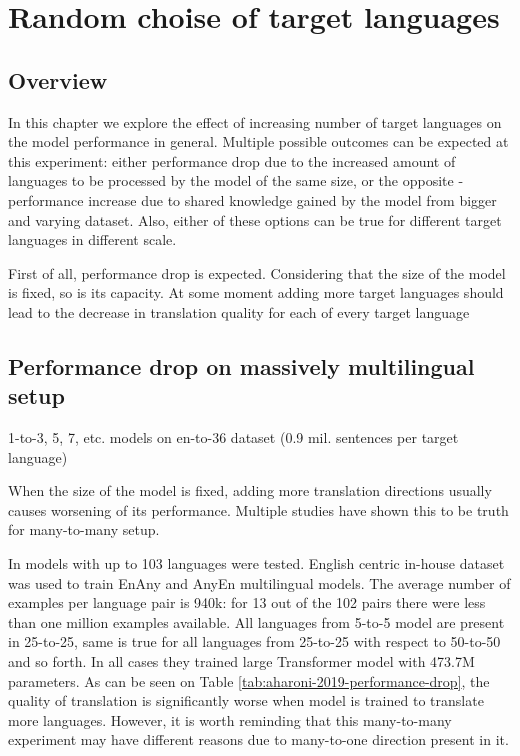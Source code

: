 \chapter{Random choise of target languages}


\section{Overview}

In this chapter we explore the effect of increasing number of target languages on the model performance in general.
Multiple possible outcomes can be expected at this experiment:
either performance drop due to the increased amount of languages to be processed by the model of the same size,
or the opposite - performance increase due to shared knowledge gained by the model from bigger and varying dataset. 
Also, either of these options can be true for different target languages in different scale.

First of all, performance drop is expected. Considering that the size of the model is fixed, so is its capacity. At some moment adding more target languages should lead to the decrease in translation quality for each of every target language


\section{Performance drop on massively multilingual setup}
1-to-3, 5, 7, etc. models on en-to-36 dataset (0.9 mil. sentences per target language)

When the size of the model is fixed, adding more translation directions usually causes
worsening of its performance. Multiple studies have shown this to be truth for
many-to-many setup.

In \cite{aharoni-etal-2019-massively} models with up to 103 languages were tested.
English centric in-house dataset was used to train En\to{}Any and Any\to{}En multilingual models.
The average number of examples per language pair is 940k:
for 13 out of the 102 pairs there were less than one million examples available.
All languages from 5-to-5 model are present in 25-to-25, same is true for all languages from 25-to-25 with respect to 50-to-50 and so forth.
In all cases they trained large Transformer model with 473.7M parameters.
As can be seen on Table \ref{tab:aharoni-2019-performance-drop}, the quality of translation
is significantly worse when model is trained to translate more languages.
However, it is worth reminding that this many-to-many experiment may have different reasons due to many-to-one direction present in it.

